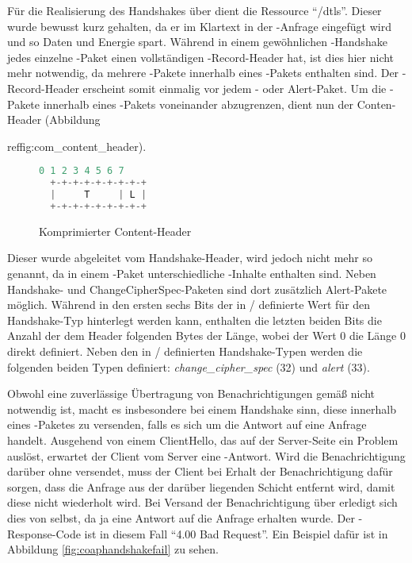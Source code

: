 Für die Realisierung des Handshakes über  dient die Ressource "`/dtls"'. Dieser  wurde bewusst kurz gehalten,
da er im Klartext in der -Anfrage eingefügt wird und so Daten und Energie spart. Während in einem gewöhnlichen -Handshake
jedes einzelne -Paket einen vollständigen -Record-Header hat, ist dies hier nicht mehr notwendig, da mehrere
-Pakete innerhalb eines -Pakets enthalten sind. Der -Record-Header erscheint somit einmalig vor jedem
- oder Alert-Paket. Um die -Pakete innerhalb eines -Pakets voneinander abzugrenzen, dient nun der
Conten-Header (Abbildung {ref{fig:com\_content\_header}).

\begin{figure}[ht]
  \centering
  \begin{lstlisting}[language=c]
   0 1 2 3 4 5 6 7
  +-+-+-+-+-+-+-+-+
  |     T     | L |
  +-+-+-+-+-+-+-+-+
  \end{lstlisting}
  \caption{Komprimierter Content-Header}
  \label{fig:com_content_header}
\end{figure}

Dieser wurde abgeleitet vom Handshake-Header, wird jedoch nicht mehr so genannt, da in einem -Paket unterschiedliche -Inhalte
enthalten sind. Neben Handshake- und ChangeCipherSpec-Paketen sind dort zusätzlich Alert-Pakete möglich. Während in den ersten sechs Bits der in
/ definierte Wert für den Handshake-Typ hinterlegt werden kann, enthalten die letzten beiden Bits die Anzahl der dem Header folgenden
Bytes der Länge, wobei der Wert 0 die Länge 0 direkt definiert. Neben den in / definierten Handshake-Typen werden die folgenden
beiden Typen definiert: \textit{change\_cipher\_spec} (32) und \textit{alert} (33).

Obwohl eine zuverlässige Übertragung von Benachrichtigungen gemäß  nicht notwendig ist, macht es insbesondere bei einem Handshake sinn, diese
innerhalb eines -Paketes zu versenden, falls es sich um die Antwort auf eine Anfrage handelt. Ausgehend von einem ClientHello, das
auf der Server-Seite ein Problem auslöst, erwartet der Client vom Server eine -Antwort. Wird die Benachrichtigung darüber ohne  versendet,
muss der Client bei Erhalt der Benachrichtigung dafür sorgen, dass die Anfrage aus der darüber liegenden  Schicht entfernt wird, damit diese
nicht wiederholt wird. Bei Versand der Benachrichtigung über  erledigt sich dies von selbst, da ja eine Antwort auf die Anfrage erhalten wurde.
Der -Response-Code ist in diesem Fall "`4.00 Bad Request"'. Ein Beispiel dafür ist in Abbildung \ref{fig:coaphandshakefail} zu sehen.

}
